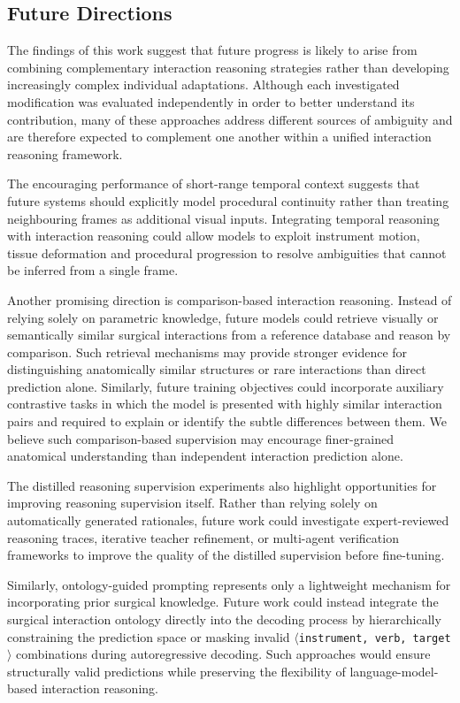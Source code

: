 \documentclass[11pt]{article}
\newcommand{\ivttriplet}{\texttt{$\langle$instrument, verb, target$\rangle$}\xspace}
\begin{document}
\subsection{Future Directions}

The findings of this work suggest that future progress is likely to arise from combining complementary interaction reasoning strategies rather than developing increasingly complex individual adaptations. Although each investigated modification was evaluated independently in order to better understand its contribution, many of these approaches address different sources of ambiguity and are therefore expected to complement one another within a unified interaction reasoning framework.

The encouraging performance of short-range temporal context suggests that future systems should explicitly model procedural continuity rather than treating neighbouring frames as additional visual inputs. Integrating temporal reasoning with interaction reasoning could allow models to exploit instrument motion, tissue deformation and procedural progression to resolve ambiguities that cannot be inferred from a single frame.

Another promising direction is comparison-based interaction reasoning. Instead of relying solely on parametric knowledge, future models could retrieve visually or semantically similar surgical interactions from a reference database and reason by comparison. Such retrieval mechanisms may provide stronger evidence for distinguishing anatomically similar structures or rare interactions than direct prediction alone. Similarly, future training objectives could incorporate auxiliary contrastive tasks in which the model is presented with highly similar interaction pairs and required to explain or identify the subtle differences between them. We believe such comparison-based supervision may encourage finer-grained anatomical understanding than independent interaction prediction alone.

The distilled reasoning supervision experiments also highlight opportunities for improving reasoning supervision itself. Rather than relying solely on automatically generated rationales, future work could investigate expert-reviewed reasoning traces, iterative teacher refinement, or multi-agent verification frameworks to improve the quality of the distilled supervision before fine-tuning.

Similarly, ontology-guided prompting represents only a lightweight mechanism for incorporating prior surgical knowledge. Future work could instead integrate the surgical interaction ontology directly into the decoding process by hierarchically constraining the prediction space or masking invalid \ivttriplet combinations during autoregressive decoding. Such approaches would ensure structurally valid predictions while preserving the flexibility of language-model-based interaction reasoning.
\end{document}
